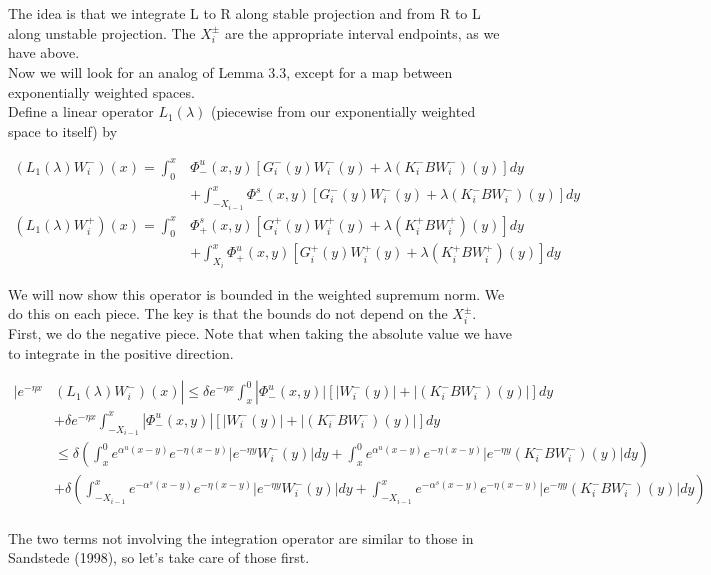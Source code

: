 \documentclass[12pt]{article}
\begin{document}
The idea is that we integrate L to R along stable projection and from R to L along unstable projection. The $X_i^\pm$ are the appropriate interval endpoints, as we have above.\\

Now we will look for an analog of Lemma 3.3, except for a map between exponentially weighted spaces. \\

Define a linear operator $L_1(\lambda)$ (piecewise from our exponentially weighted space to itself) by

\begin{align*}
(L_1(\lambda)W_i^-)(x) = \int_0^x &\Phi^u_-(x, y)[G_i^-(y) W_i^-(y) + \lambda (K_i^- B W_i^-)(y) ] dy \\
&+ \int_{-X_{i-1}}^x \Phi^s_-(x, y)[G_i^-(y) W_i^-(y) + \lambda (K_i^-B W_i^-)(y) ] dy \\
(L_1(\lambda)W_i^+)(x) = \int_0^x &\Phi^s_+(x, y)[G_i^+(y) W_i^+(y) + \lambda (K_i^+ B W_i^+)(y)] dy \\
&+ \int_{X_{i}}^x \Phi^u_+(x, y)[G_i^+(y) W_i^+(y) + \lambda (K_i^+ B W_i^+)(y) ] dy
\end{align*}

We will now show this operator is bounded in the weighted supremum norm. We do this on each piece. The key is that the bounds do not depend on the $X_i^\pm$. First, we do the negative piece. Note that when taking the absolute value we have to integrate in the positive direction.

\begin{align*}
|e^{-\eta x} & (L_1(\lambda)W_i^-)(x) | \leq \delta e^{-\eta x} \int_x^0 |\Phi^u_-(x, y)|[|W_i^-(y)| + |(K_i^- B W_i^-)(y)| ] dy \\
&+ \delta e^{-\eta x} \int_{-X_{i-1}}^x |\Phi^u_-(x, y)|[|W_i^-(y)| + |(K_i^- B W_i^-)(y)| ] dy \\
&\leq \delta \left( \int_x^0 e^{\alpha^u (x-y)}e^{-\eta(x-y)}|e^{-\eta y} W_i^-(y)| dy 
+ \int_x^0 e^{\alpha^u (x-y)}e^{-\eta(x-y)}|e^{-\eta y} (K_i^- B W_i^-)(y)| dy  \right) \\
&+ \delta \left( \int_{-X_{i-1}}^x e^{-\alpha^s (x-y)}e^{-\eta(x-y)}|e^{-\eta y} W_i^-(y)| dy 
+ \int_{-X_{i-1}}^x e^{-\alpha^s (x-y)}e^{-\eta(x-y)}|e^{-\eta y} (K_i^- B W_i^-)(y)| dy  \right) \\ 
\end{align*}

The two terms not involving the integration operator are similar to those in Sandstede (1998), so let's take care of those first.
\end{document}

